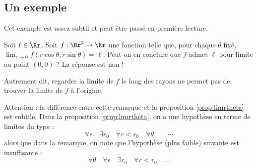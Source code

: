 \documentclass[11pt, class=report,crop=false]{standalone}
\begin{document}
 

\subsection{Un exemple}

Cet exemple est assez subtil et peut être passé en première lecture.

\begin{remarque*}
Soit $\ell \in \Rr$. Soit $f: \Rr^2 \rightarrow \Rr$ une fonction telle que, pour chaque $\theta$ fixé, $\displaystyle \lim_{r \to0} f(r\cos\theta, r\sin\theta)=\ell$. Peut-on en conclure que $f$ admet $\ell$ pour limite au point $(0,0)$ ? La réponse est non !

Autrement dit, regarder la limite de $f$ le long des rayons ne permet pas de trouver la limite de $f$ à l'origine.
\end{remarque*}

Attention : la différence entre cette remarque et la proposition \ref{prop:limrtheta} est subtile. Dans la proposition \ref{prop:limrtheta}, on a une hypothèse en terme de limites du type :
$$\forall \epsilon \quad \exists r_0 \quad \forall r<r_0 \quad \forall \theta \quad  \quad \cdots$$
alors que dans la remarque, on note que l'hypothèse (plus faible) suivante est insuffisante :
$$ \forall \theta \quad \forall \epsilon \quad \exists r_0 \quad \forall r<r_0 \quad \ldots$$
\end{document}
